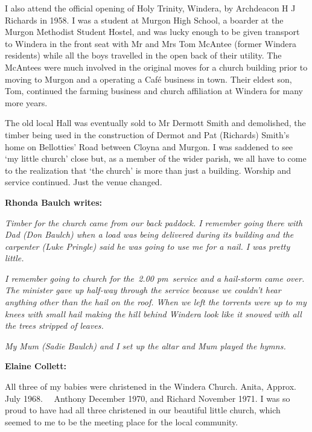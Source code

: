 I also attend the official opening of Holy Trinity, Windera, by Archdeacon H J Richards in 1958. I was a student at Murgon High School, a boarder at the Murgon Methodist Student Hostel, and was lucky enough to be given transport to Windera in the front seat with Mr and Mrs Tom McAntee (former Windera residents) while all the boys travelled in the open back of their utility. The McAntees were much involved in the original moves for a church building prior to moving to Murgon and a operating a Café business in town. Their eldest son, Tom, continued the farming business and church affiliation at Windera for many more years.



The old local Hall was eventually sold to Mr Dermott Smith and demolished, the timber being used in the construction of Dermot and Pat (Richards) Smith's home on Bellotties' Road between Cloyna and Murgon. I was saddened to see `my little church' close but, as a member of the wider parish, we all have to come to the realization that `the church' is more than just a building. Worship and service continued. Just the venue changed.



\textbf{Rhonda Baulch writes:}



\emph{Timber for the church came from our back paddock. I remember going there with Dad (Don Baulch) when a load was being delivered during its building and the carpenter (Luke Pringle) said he was going to use me for a nail. I was pretty little.}



\emph{I remember going to church for the~2.00 pm~service and a hail-storm came over. The minister gave up half-way through the service because we couldn't hear anything other than the hail on the roof. When we left the torrents were up to my knees with small hail making the hill behind Windera look like it snowed with all the trees stripped of leaves.}



\emph{My Mum (Sadie Baulch) and I set up the altar and Mum played the hymns.}



\textbf{Elaine Collett:}



All three of my babies were christened in the Windera Church. Anita, Approx. July 1968.~~ Anthony December 1970, and Richard November 1971. I was so proud to have had all three christened in our beautiful little church, which seemed to me to be the meeting place for the local community.



